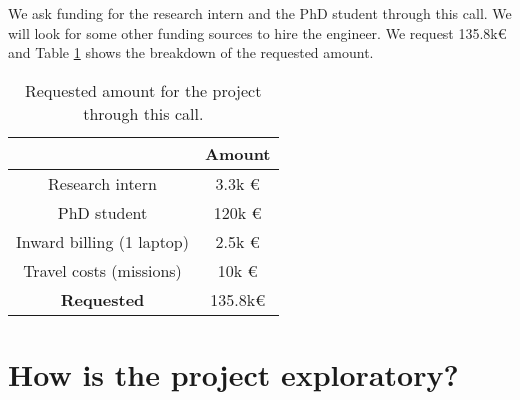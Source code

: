 \documentclass[11pt]{article}
\begin{document}
We ask funding for the research intern and the PhD student through this call. We will look for some other funding sources to hire the engineer.  We request 135.8k\euro\xspace and Table \ref{tab:reqcost} shows the breakdown of the requested amount.


\begin{table}[h]
	\vspace*{-0.3cm}\begin{center}
		\begin{tabular}{|c|c|}
			\hline
			& Amount\\ \hline
			Research intern & 3.3k \euro \\ \hline
			PhD student & 120k \euro \\ \hline
			Inward billing (1 laptop) & 2.5k \euro \\ \hline
			Travel costs (missions) & 10k \euro \\ \hline
			\textbf{Requested} & 135.8k\euro\\ \hline
		\end{tabular}\vspace*{-0.15cm}
		\caption{Requested amount for the project through this call.\label{tab:reqcost}}
	\end{center}
\end{table}





\section{How is the project exploratory?}

\end{document}

